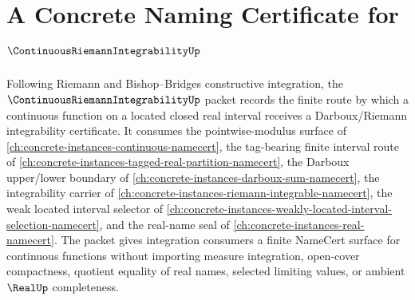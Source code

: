 \chapter{A Concrete Naming Certificate for $\ContinuousRiemannIntegrabilityUp$}
\label{ch:concrete-instances-continuous-riemann-integrability-namecert}

Following Riemann and Bishop--Bridges constructive integration, the $\ContinuousRiemannIntegrabilityUp$ packet records the finite route by which a continuous function on a located closed real interval receives a Darboux/Riemann integrability certificate. It consumes the pointwise-modulus surface of \autoref{ch:concrete-instances-continuous-namecert}, the tag-bearing finite interval route of \autoref{ch:concrete-instances-tagged-real-partition-namecert}, the Darboux upper/lower boundary of \autoref{ch:concrete-instances-darboux-sum-namecert}, the integrability carrier of \autoref{ch:concrete-instances-riemann-integrable-namecert}, the weak located interval selector of \autoref{ch:concrete-instances-weakly-located-interval-selection-namecert}, and the real-name seal of \autoref{ch:concrete-instances-real-namecert}. The packet gives integration consumers a finite NameCert surface for continuous functions without importing measure integration, open-cover compactness, quotient equality of real names, selected limiting values, or ambient $\RealUp$ completeness.

